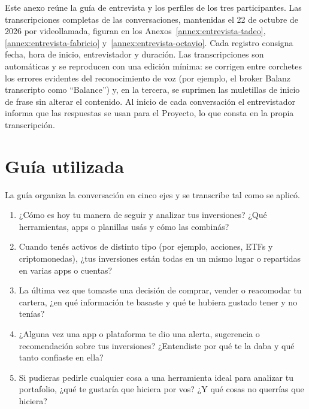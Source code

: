 \label{annex:entrevistas}

Este anexo reúne la guía de entrevista y los perfiles de los tres participantes. Las transcripciones completas de las conversaciones, mantenidas el 22 de octubre de 2026 por videollamada, figuran en los Anexos~\ref{annex:entrevista-tadeo}, \ref{annex:entrevista-fabricio} y~\ref{annex:entrevista-octavio}. Cada registro consigna fecha, hora de inicio, entrevistador y duración. Las transcripciones son automáticas y se reproducen con una edición mínima: se corrigen entre corchetes los errores evidentes del reconocimiento de voz (por ejemplo, el broker Balanz transcripto como \enquote{Balance}) y, en la tercera, se suprimen las muletillas de inicio de frase sin alterar el contenido. Al inicio de cada conversación el entrevistador informa que las respuestas se usan para el Proyecto, lo que consta en la propia transcripción.

\section*{Guía utilizada}
La guía organiza la conversación en cinco ejes y se transcribe tal como se aplicó.
\begin{enumerate}
\item ¿Cómo es hoy tu manera de seguir y analizar tus inversiones? ¿Qué herramientas, apps o planillas usás y cómo las combinás?
\item Cuando tenés activos de distinto tipo (por ejemplo, acciones, ETFs y criptomonedas), ¿tus inversiones están todas en un mismo lugar o repartidas en varias apps o cuentas?
\item La última vez que tomaste una decisión de comprar, vender o reacomodar tu cartera, ¿en qué información te basaste y qué te hubiera gustado tener y no tenías?
\item ¿Alguna vez una app o plataforma te dio una alerta, sugerencia o recomendación sobre tus inversiones? ¿Entendiste por qué te la daba y qué tanto confiaste en ella?
\item Si pudieras pedirle cualquier cosa a una herramienta ideal para analizar tu portafolio, ¿qué te gustaría que hiciera por vos? ¿Y qué cosas no querrías que hiciera?
\end{enumerate}

